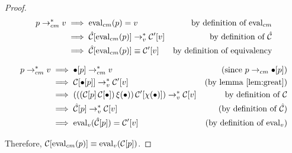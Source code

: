 \begin{proof}

\begin{align*}
p\rightarrow_{cm}^{*} v &\implies\mathrm{eval}_{cm}(p)=v &\text{by definition of $\mathrm{eval}_{cm}$}\\
          &\implies\hat{\mathcal{C}}[\mathrm{eval}_{cm}(p)]\rightarrow_v^{*}\mathcal{C}'[v] &\text{by definition of $\hat{\mathcal{C}}$}\\
          &\implies\hat{\mathcal{C}}[\mathrm{eval}_{cm}(p)]\equiv\mathcal{C}'[v] &\text{by definition of equivalency}\\
\end{align*}

\begin{align*}
p\rightarrow_{cm}^{*} v &\implies\bullet[p]\rightarrow_{cm}^{*} v &\text{(since $p\rightarrow_{cm}\bullet[p]$)}\\
          &\implies\mathcal{C}[\bullet[p]]\rightarrow_v^{*}\mathcal{C}'[v] &\text{(by lemma \ref{lem:great})}\\
          &\implies(((\mathcal{C}[p]\,\mathcal{C}[\bullet])\,\xi(\bullet))\,\mathcal{C}'[\chi(\bullet)])\rightarrow_v^{*}\mathcal{C}[v]&\text{by definition of $\mathcal{C}$}\\
          &\implies\hat{\mathcal{C}}[p]\rightarrow_v^{*}\mathcal{C}[v]&\text{(by definition of $\hat{\mathcal{C}}$)}\\
          &\implies\mathrm{eval}_{v}(\hat{\mathcal{C}}[p])=\mathcal{C}'[v] &\text{(by definition of $\mathrm{eval}_v$)}
\end{align*}

Therefore, $\mathcal{C}[\mathrm{eval}_{cm}(p)]\equiv\mathrm{eval}_{v}(\mathcal{C}[p])$.
\end{proof}
